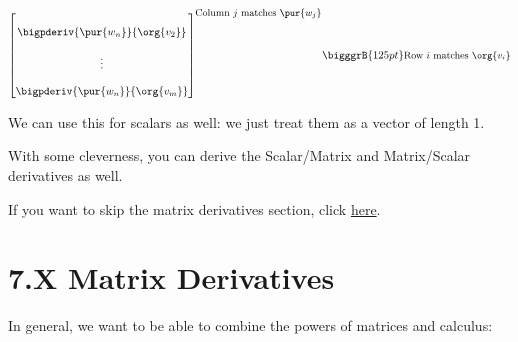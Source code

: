 \begin{equation}
{\begin{bmatrix}
\begin{matrix}
                            \\
                            \bigpderiv{ \pur{w_n} }   { \org{v_2} }\\ 
                            \\
                            \vdots \\ 
                            \\
                            \bigpderiv{ \pur{w_n} }   { \org{v_m} }
                        \end{matrix}
                    \end{bmatrix}
                }^{ \text{\small Column $j$ matches $\pur{w_j}$} }
                \bigggrB{125pt} \text{\small Row $i$ matches $\org{v_i}$} 
            \end{equation}
            
            We can use this for scalars as well: we just treat them as a vector of length 1.
            
            With some cleverness, you can derive the Scalar/Matrix and Matrix/Scalar derivatives as well.  
        
            \secdiv
            
            If you want to skip the matrix derivatives section, click \hyperref[training]{here}.
\pagebreak
        
\section*{7.X  Matrix Derivatives}
    \label{mderiv}
        
    In general, we want to be able to combine the powers of matrices and calculus:
    
